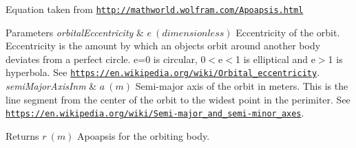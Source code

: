 Equation taken from \href{http://mathworld.wolfram.com/Apoapsis.html}{\tt http\+://mathworld.\+wolfram.\+com/\+Apoapsis.\+html}


\begin{DoxyParams}{Parameters}
{\em orbital\+Eccentricity} & $ e\ (dimensionless)$ Eccentricity of the orbit. Eccentricity is the amount by which an objects orbit around another body deviates from a perfect circle. e=0 is circular, 0$<$e$<$1 is elliptical and e$>$1 is hyperbola. See \href{https://en.wikipedia.org/wiki/Orbital_eccentricity}{\tt https\+://en.\+wikipedia.\+org/wiki/\+Orbital\+\_\+eccentricity}. \\
\hline
{\em semi\+Major\+Axis\+Inm} & $ a\ (m)$ Semi-\/major axis of the orbit in meters. This is the line segment from the center of the orbit to the widest point in the perimiter. See \href{https://en.wikipedia.org/wiki/Semi-major_and_semi-minor_axes}{\tt https\+://en.\+wikipedia.\+org/wiki/\+Semi-\/major\+\_\+and\+\_\+semi-\/minor\+\_\+axes}. \\
\hline
\end{DoxyParams}
\begin{DoxyReturn}{Returns}
$ r\ (m)$ Apoapsis for the orbiting body. 
\end{DoxyReturn}
